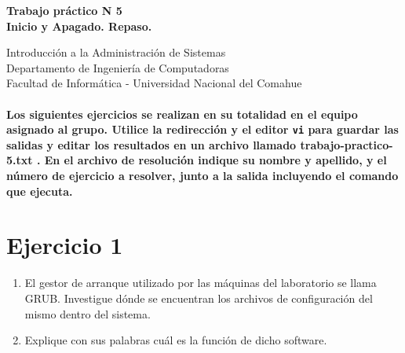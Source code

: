 \documentclass[12pt]{article}
\def\maketitle{

 \makeatletter
 {\color{bl} \centering \huge \sc \textbf{
Trabajo práctico N 5 \\
\large \vspace*{-8pt} \color{black} Inicio y Apagado. Repaso. 
 \vspace*{8pt} }\par}
 \makeatother


 \makeatletter
 {\centering \small 
	Introducción a la Administración de Sistemas \\
 	Departamento de Ingeniería de Computadoras \\
 	Facultad de Informática - Universidad Nacional del Comahue \\
 	\vspace{20pt} }
 \makeatother

}
\begin{document}
\thispagestyle{empty}
\maketitle
\setlength{\parindent}{0pt}

\paragraph{Los siguientes ejercicios se realizan en su totalidad en el equipo asignado al grupo.
Utilice la redirección y el editor \texttt{vi} para guardar las salidas y editar los resultados 
en un archivo llamado trabajo-practico-5.txt . En el archivo de resolución indique su nombre y apellido, 
y el número de ejercicio a resolver, junto a la salida incluyendo el comando que ejecuta. }

\section*{Ejercicio 1}

\begin{enumerate}
\item El gestor de arranque utilizado por las máquinas del laboratorio se llama GRUB. Investigue 
dónde se encuentran los archivos de configuración del mismo dentro del sistema. 
\item Explique con sus palabras cuál es la función de dicho software.
\end{enumerate}
\end{document}
